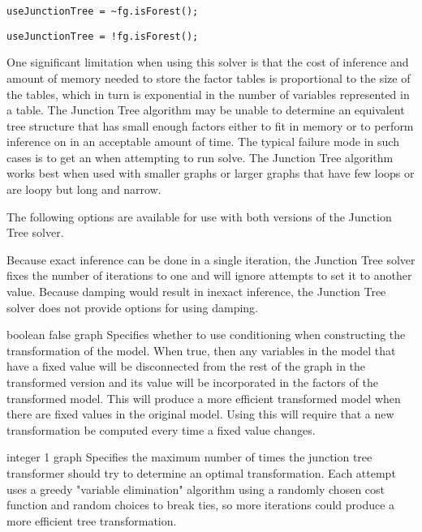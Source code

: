\ifmatlab
\begin{lstlisting}
useJunctionTree = ~fg.isForest();
\end{lstlisting}
\fi

\ifjava
\begin{lstlisting}
useJunctionTree = !fg.isForest();
\end{lstlisting}
\fi

One significant limitation when using this solver is that the cost of inference and amount of memory needed to store the factor tables is proportional to the size of the tables, which in turn is exponential in the number of variables represented in a table. The Junction Tree algorithm may be unable to determine an equivalent tree structure that has small enough factors either to fit in memory or to perform inference on in an acceptable amount of time. The typical failure mode in such cases is to get an  when attempting to run solve. The Junction Tree algorithm works best when used with smaller graphs or larger graphs that have few loops or are loopy but long and narrow.

\label{sec:JunctionTreeOptions}

The following options are available for use with both versions of the Junction Tree solver.

Because exact inference can be done in a single iteration, the Junction Tree solver fixes the number of iterations to one and will ignore attempts to set it to another value. Because damping would result in inexact inference, the Junction Tree solver does not provide options for using damping.


{boolean}
{false}
{graph}
{Specifies whether to use conditioning when constructing the transformation of the model. When true, then any variables in the model that have a fixed value will be disconnected from the rest of the graph in the transformed version and its value will be incorporated in the factors of the transformed model. This will produce a more efficient transformed model when there are fixed values in the original model. Using this will require that a new transformation be computed every time a fixed value changes.}


{integer}
{1}
{graph}
{Specifies the maximum number of times the junction tree transformer should try to determine an optimal transformation. Each attempt uses a greedy "variable elimination" algorithm using a randomly chosen cost function and random choices to break ties, so more iterations could produce a more efficient tree transformation.}


